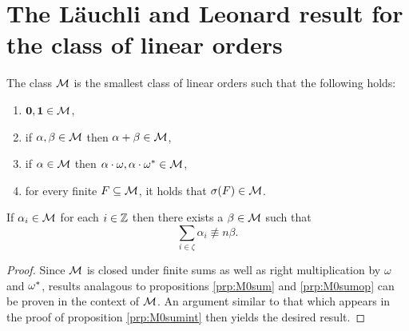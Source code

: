 \section{The L\"auchli and Leonard result for the class of linear orders}

\begin{dfn}
	The class $\mathcal{M}$ is the smallest class of linear orders such that the following holds:
	\begin{enumerate}
		\item	$\mathbf{0},\mathbf{1}\in\mathcal{M}$,
		\item	if $\alpha,\beta\in\mathcal{M}$ then $\alpha+\beta\in\mathcal{M}$,
		\item	if $\alpha\in\mathcal{M}$ then $\alpha\cdot\omega,\alpha\cdot{\omega}^\ast\in\mathcal{M}$,
		\item	for every finite $F\subseteq\mathcal{M}$, it holds that $\sigma(F)\in\mathcal{M}$.
	\end{enumerate}
\end{dfn}

\begin{prp}\label{prp:Msumint}
	If $\alpha_i\in\mathcal{M}$ for each $i\in\mathbb{Z}$ then there exists a $\beta\in\mathcal{M}$ such that\
	\begin{equation}
		\sum_{i\in\zeta}\alpha_i\nequiv{n}\beta.
	\end{equation}
\end{prp}
\begin{proof}
	Since $\mathcal{M}$ is closed under finite sums as well as right multiplication by $\omega$ and ${\omega}^\ast$, results analagous to propositions \ref{prp:M0sum} and \ref{prp:M0sumop} can be proven in the context of $\mathcal{M}$.  An argument similar to that which appears in the proof of proposition \ref{prp:M0sumint} then yields the desired result.
\end{proof}


